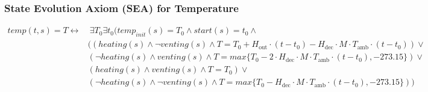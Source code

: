 \documentclass{assignment}
\begin{document}
\begin{problem}
\subsubsection*{State Evolution Axiom (SEA) for Temperature}
\begin{align*}
temp(t, s) = T \leftrightarrow & \ \exists T_0 \exists t_0 \Big(temp_{init}(s) = T_0 \land start(s) = t_0 \land \\
& \Big( (heating(s) \land \neg venting(s) \land T = T_0 + H_{\text{out}} \cdot (t - t_0) - H_{\text{dec}} \cdot M \cdot T_{\text{amb}} \cdot (t - t_0)) \lor \\
& (\neg heating(s) \land venting(s) \land T = max\{T_0 - 2\cdot H_{\text{dec}} \cdot M \cdot T_{\text{amb}} \cdot (t - t_0), -273.15\})\lor\\
& ( heating(s) \land venting(s) \land T = T_0)\lor\\
& (\neg heating(s) \land \neg venting(s) \land  T = max\{T_0 - H_{\text{dec}} \cdot M \cdot T_{\text{amb}} \cdot (t - t_0), -273.15\})\Big)
\end{align*}

\end{problem}
\end{document}
